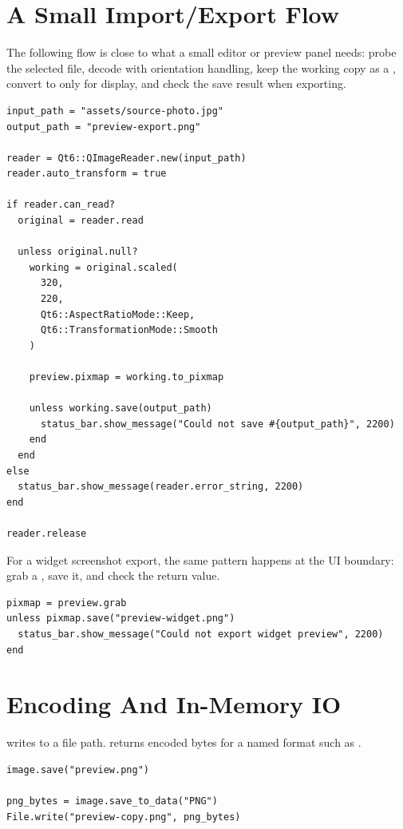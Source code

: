 \section{A Small Import/Export Flow}

The following flow is close to what a small editor or preview panel needs: probe the selected file, decode with orientation handling, keep the working copy as a , convert to  only for display, and check the save result when exporting.

\begin{lstlisting}[style=crystal]
input_path = "assets/source-photo.jpg"
output_path = "preview-export.png"

reader = Qt6::QImageReader.new(input_path)
reader.auto_transform = true

if reader.can_read?
  original = reader.read

  unless original.null?
    working = original.scaled(
      320,
      220,
      Qt6::AspectRatioMode::Keep,
      Qt6::TransformationMode::Smooth
    )

    preview.pixmap = working.to_pixmap

    unless working.save(output_path)
      status_bar.show_message("Could not save #{output_path}", 2200)
    end
  end
else
  status_bar.show_message(reader.error_string, 2200)
end

reader.release
\end{lstlisting}

For a widget screenshot export, the same pattern happens at the UI boundary: grab a , save it, and check the return value.

\begin{lstlisting}[style=crystal]
pixmap = preview.grab
unless pixmap.save("preview-widget.png")
  status_bar.show_message("Could not export widget preview", 2200)
end
\end{lstlisting}

\section{Encoding And In-Memory IO}

 writes to a file path.  returns encoded bytes for a named format such as .

\begin{lstlisting}[style=crystal]
image.save("preview.png")

png_bytes = image.save_to_data("PNG")
File.write("preview-copy.png", png_bytes)
\end{lstlisting}

